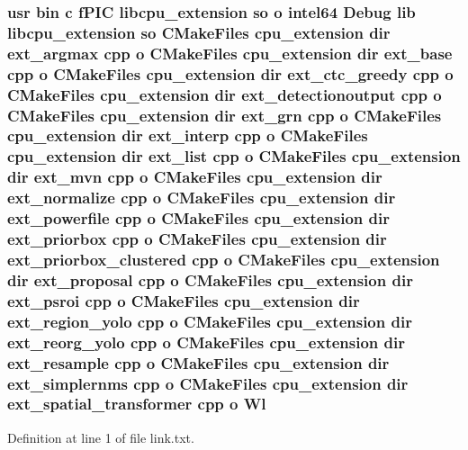 \subsubsection[{\texorpdfstring{Wl}{Wl}}]{\setlength{\rightskip}{0pt plus 5cm}usr bin {\bf c} f\+P\+IC libcpu\+\_\+extension {\bf so} o intel64 Debug lib libcpu\+\_\+extension {\bf so} C\+Make\+Files {\bf cpu\+\_\+extension} dir ext\+\_\+argmax cpp o C\+Make\+Files {\bf cpu\+\_\+extension} dir ext\+\_\+base cpp o C\+Make\+Files {\bf cpu\+\_\+extension} dir ext\+\_\+ctc\+\_\+greedy cpp o C\+Make\+Files {\bf cpu\+\_\+extension} dir ext\+\_\+detectionoutput cpp o C\+Make\+Files {\bf cpu\+\_\+extension} dir ext\+\_\+grn cpp o C\+Make\+Files {\bf cpu\+\_\+extension} dir ext\+\_\+interp cpp o C\+Make\+Files {\bf cpu\+\_\+extension} dir ext\+\_\+list cpp o C\+Make\+Files {\bf cpu\+\_\+extension} dir ext\+\_\+mvn cpp o C\+Make\+Files {\bf cpu\+\_\+extension} dir ext\+\_\+normalize cpp o C\+Make\+Files {\bf cpu\+\_\+extension} dir ext\+\_\+powerfile cpp o C\+Make\+Files {\bf cpu\+\_\+extension} dir ext\+\_\+priorbox cpp o C\+Make\+Files {\bf cpu\+\_\+extension} dir ext\+\_\+priorbox\+\_\+clustered cpp o C\+Make\+Files {\bf cpu\+\_\+extension} dir ext\+\_\+proposal cpp o C\+Make\+Files {\bf cpu\+\_\+extension} dir ext\+\_\+psroi cpp o C\+Make\+Files {\bf cpu\+\_\+extension} dir ext\+\_\+region\+\_\+yolo cpp o C\+Make\+Files {\bf cpu\+\_\+extension} dir ext\+\_\+reorg\+\_\+yolo cpp o C\+Make\+Files {\bf cpu\+\_\+extension} dir ext\+\_\+resample cpp o C\+Make\+Files {\bf cpu\+\_\+extension} dir ext\+\_\+simplernms cpp o C\+Make\+Files {\bf cpu\+\_\+extension} dir ext\+\_\+spatial\+\_\+transformer cpp o Wl}\hypertarget{extension_2CMakeFiles_2cpu__extension_8dir_2link_8txt_af9ccbf658ed2deb89d0d79f211e5b033}{}\label{extension_2CMakeFiles_2cpu__extension_8dir_2link_8txt_af9ccbf658ed2deb89d0d79f211e5b033}


Definition at line 1 of file link.\+txt.

